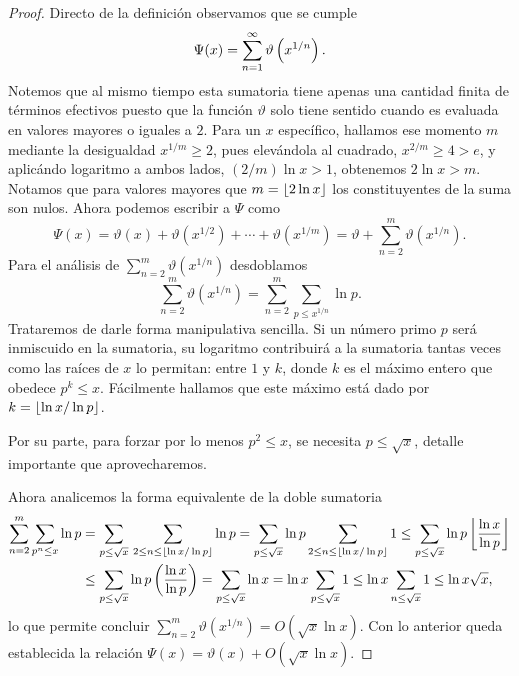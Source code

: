 \begin{proof}
  Directo de la definici\'on observamos que se cumple 
  \[
    \Psi(x) = \sum_{n = 1}^\infty \vartheta\left( x^{1/n} \right).
  \]
  Notemos que al mismo tiempo esta sumatoria tiene apenas
  una cantidad finita de t\'erminos efectivos puesto que la funci\'on \(\vartheta\)
  solo tiene sentido cuando es evaluada en valores mayores o iguales a \(2\).
  Para un \(x\) espec\'ifico, hallamos ese momento \(m\) mediante la desigualdad
  \(x^{1/m} \geq 2\),
  pues elev\'andola al cuadrado,
  \(x^{2/m} \geq 4 > e\),
  y aplic\'ando logaritmo a ambos lados,
  \((2/m)\ln x > 1\),
  obtenemos
  \(2 \ln x > m\).
  Notamos que para valores mayores que
  \(m = \left\lfloor 2 \ln x \right\rfloor\) los constituyentes de la suma son nulos.
  Ahora podemos escribir a \(\Psi\) como 
  \[
    \Psi(x) = \vartheta(x) + \vartheta(x^{1/2}) + \cdots + \vartheta(x^{1/m})
    = \vartheta + \sum_{n = 2}^m \vartheta(x^{1/n}).
  \]
  Para el an\'alisis de \(\sum_{n = 2}^m \vartheta(x^{1/n})\) desdoblamos
  \[
    \sum_{n = 2}^m \vartheta(x^{1/n})
    = \sum_{n = 2}^m \sum_{p \leq x^{1/n}} \ln p.
  \]
  Trataremos de darle forma manipulativa sencilla.
  Si un n\'umero primo \(p\) ser\'a inmiscuido en la sumatoria,
  su logaritmo contribuir\'a a la sumatoria tantas veces como las ra\'ices de \(x\) lo permitan:
  entre \(1\) y \(k\), donde \(k\) es el m\'aximo entero que obedece \(p^k \le x\).
  F\'acilmente hallamos que este m\'aximo est\'a dado por \(k = \left\lfloor \ln x / \ln p \right\rfloor\).
  
  Por su parte, para forzar por lo menos \(p^2 \le x\),
  se necesita \(p \le \sqrt{x}\), detalle importante que aprovecharemos.
  
  Ahora analicemos la forma equivalente de la doble sumatoria
  \begin{align*}
    \sum_{n = 2}^m \sum_{p^n \leq x} \ln p
    &= \sum_{p \leq \sqrt{x}} \, \sum_{2 \leq n \leq \left\lfloor \ln x / \ln p \right\rfloor} \ln p
    = \sum_{p \leq \sqrt{x}} \ln p \sum_{2 \leq n \leq \left\lfloor \ln x / \ln p \right\rfloor} 1
    \leq \sum_{p \leq \sqrt{x}} \ln p \left\lfloor \frac{\ln x}{\ln p} \right\rfloor \\
    &\leq \sum_{p \leq \sqrt{x}} \ln p \left( \frac{\ln x}{\ln p} \right)
    = \sum_{p \leq \sqrt{x}} \ln x
    = \ln x \sum_{p \leq \sqrt{x}} 1
    \leq \ln x \sum_{n \leq \sqrt{x}} 1
    \leq \ln x \sqrt{x}, 
  \end{align*}
  lo que permite concluir \(\sum_{n = 2}^m \vartheta(x^{1/n}) = O(\sqrt{x} \ln x)\).
  Con lo anterior queda establecida la relaci\'on \(\Psi(x) = \vartheta(x) + O(\sqrt{x} \ln x)\).
\end{proof}

